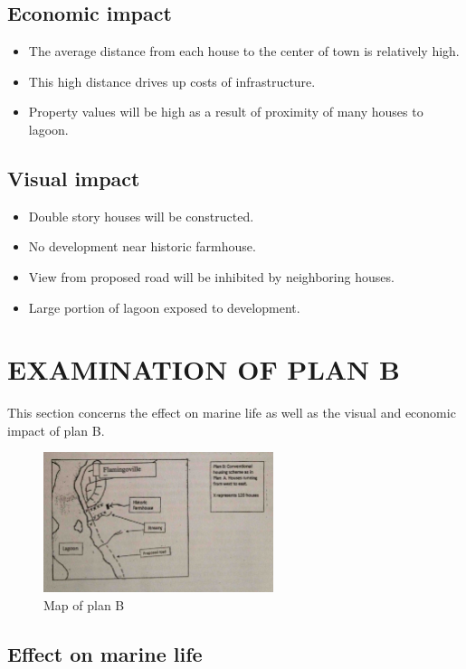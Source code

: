 \documentclass{article}
\begin{document}
\subsection{Economic impact}
\begin{itemize}
	\item The average distance from each house to the center of town is relatively high.
	\item This high distance drives up costs of infrastructure.
	\item Property values will be high as a result of proximity of many houses to lagoon.
\end{itemize}

\subsection{Visual impact}
\begin{itemize}
	\item Double story houses will be constructed.
	\item No development near historic farmhouse.
	\item View from proposed road will be inhibited by neighboring houses.
	\item Large portion of lagoon exposed to development.
\end{itemize}

\newpage
\section{EXAMINATION OF PLAN B}
This section concerns the effect on marine life as well as the visual and economic impact of plan B.

\begin{figure}[h!]
	\centering
	\includegraphics[width=0.6\textwidth]{plan_b}
	\caption{Map of plan B}
\end{figure}

\subsection{Effect on marine life}
\end{document}
